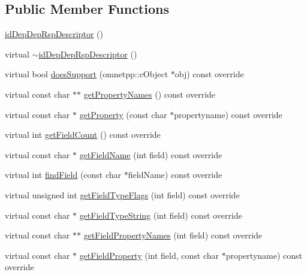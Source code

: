 \subsection*{Public Member Functions}
\begin{DoxyCompactItemize}
\item 
\hyperlink{classidDepDepRspDescriptor_a3e2274676a0c9a331848c609c9896ecf}{id\+Dep\+Dep\+Rsp\+Descriptor} ()
\item 
virtual \hyperlink{classidDepDepRspDescriptor_a35bc747b5221c962f04af7f5370f7f4b}{$\sim$id\+Dep\+Dep\+Rsp\+Descriptor} ()
\item 
virtual bool \hyperlink{classidDepDepRspDescriptor_a67b0832686fbd38cfb80742967116e83}{does\+Support} (omnetpp\+::c\+Object $\ast$obj) const override
\item 
virtual const char $\ast$$\ast$ \hyperlink{classidDepDepRspDescriptor_a1d0ba88794577cd83f8d752bbf61845b}{get\+Property\+Names} () const override
\item 
virtual const char $\ast$ \hyperlink{classidDepDepRspDescriptor_ad149f4ccae414eb97ce9959fe4b852c7}{get\+Property} (const char $\ast$propertyname) const override
\item 
virtual int \hyperlink{classidDepDepRspDescriptor_a7dcb46ff173cfd041ed0299eeef3e09d}{get\+Field\+Count} () const override
\item 
virtual const char $\ast$ \hyperlink{classidDepDepRspDescriptor_a74aea0c9020a73de0a76814586b94406}{get\+Field\+Name} (int field) const override
\item 
virtual int \hyperlink{classidDepDepRspDescriptor_ae74524f33495bc3f07c716c8f8ca2d1f}{find\+Field} (const char $\ast$field\+Name) const override
\item 
virtual unsigned int \hyperlink{classidDepDepRspDescriptor_a93352aea8757f59f6ae4f349733a4dea}{get\+Field\+Type\+Flags} (int field) const override
\item 
virtual const char $\ast$ \hyperlink{classidDepDepRspDescriptor_af3d0017c6dfbd3fceb127ea34563d7fe}{get\+Field\+Type\+String} (int field) const override
\item 
virtual const char $\ast$$\ast$ \hyperlink{classidDepDepRspDescriptor_aa14ccdc15e3d4c79f0ae6517d1222e8f}{get\+Field\+Property\+Names} (int field) const override
\item 
virtual const char $\ast$ \hyperlink{classidDepDepRspDescriptor_a177024add048c4071ea703c072a2733c}{get\+Field\+Property} (int field, const char $\ast$propertyname) const override
\item 

\end{DoxyCompactItemize}
